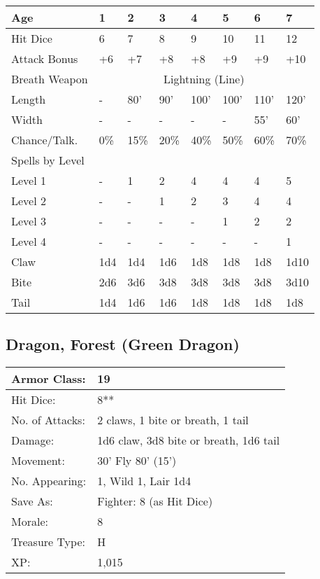 \documentclass[a4paper,twoside,openany,10pt]{book}
\begin{document}
\begin{multicols}{2}
\begin{center}
\begin{tabularx}{0.47\textwidth}{@{}lXXXXXXX@{}}
Age & 1 & 2 & 3 & 4 & 5 & 6 & 7 \\\hline
Hit Dice & 6 & 7 & 8 & 9 & 10 & 11 & 12 \\\hline
Attack Bonus & +6 & +7 & +8 & +8 & +9 & +9 & +10 \\\hline
Breath Weapon&  \multicolumn{7}{c}{Lightning (Line)}\\\hline
Length & - & 80' & 90' & 100' & 100' & 110' & 120' \\\hline
Width & - & - & - & - & - & 55' & 60' \\\hline
Chance/Talk. & 0\% & 15\% & 20\% & 40\% & 50\% & 60\% & 70\% \\\hline
Spells by Level& &&&&&&\\\hline
Level 1 & - & 1 & 2 & 4 & 4 & 4 & 5 \\\hline
Level 2 & - & - & 1 & 2 & 3 & 4 & 4 \\\hline
Level 3 & - & - & - & - & 1 & 2 & 2 \\\hline
Level 4 & - & - & - & - & - & - & 1 \\\hline
Claw & 1d4 & 1d4 & 1d6 & 1d8 & 1d8 & 1d8 & 1d10 \\\hline
Bite & 2d6 & 3d6 & 3d8 & 3d8 & 3d8 & 3d8 & 3d10 \\\hline
Tail & 1d4 & 1d6 & 1d6 & 1d8 & 1d8 & 1d8 & 1d8 \\\hline
\end{tabularx}

\end{center}

\subsection*{Dragon, Forest (Green Dragon)}\label{dragon-forest-green-dragon}

\begin{tabularx}{0.48\textwidth}{@{}lX@{}}
Armor Class: & 19 \\\hline
Hit Dice: & 8** \\\hline
No. of Attacks: & 2 claws, 1 bite or breath, 1 tail \\\hline
Damage: & 1d6 claw, 3d8 bite or breath, 1d6 tail \\\hline
Movement: & 30' Fly 80'
(15') \\\hline
No. Appearing: & 1, Wild 1, Lair 1d4 \\\hline
Save As: & Fighter: 8 (as Hit Dice) \\\hline
Morale: & 8 \\\hline
Treasure Type: & H \\\hline
XP: & 1,015 \\\hline
\end{tabularx}\medskip


\end{multicols}
\end{document}
